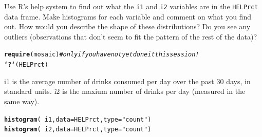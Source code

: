 \documentclass[twoside]{book}\usepackage[]{graphicx}\usepackage[]{xcolor}
\makeatletter
\newcommand{\hlstr}[1]{\textcolor[rgb]{0.192,0.494,0.8}{#1}}%
\newcommand{\hlcom}[1]{\textcolor[rgb]{0.678,0.584,0.686}{\textit{#1}}}%
\newcommand{\hlopt}[1]{\textcolor[rgb]{0,0,0}{#1}}%
\newcommand{\hlstd}[1]{\textcolor[rgb]{0.345,0.345,0.345}{#1}}%
\newcommand{\hlkwc}[1]{\textcolor[rgb]{0.333,0.667,0.333}{#1}}%
\newcommand{\hlkwd}[1]{\textcolor[rgb]{0.737,0.353,0.396}{\textbf{#1}}}%
\newenvironment{kframe}{%
 \def\at@end@of@kframe{}%
 \ifinner\ifhmode%
  \def\at@end@of@kframe{\end{minipage}}%
  \begin{minipage}{\columnwidth}%
 \fi\fi%
 \def\FrameCommand##1{\hskip\@totalleftmargin \hskip-\fboxsep
 \colorbox{shadecolor}{##1}\hskip-\fboxsep
     \hskip-\linewidth \hskip-\@totalleftmargin \hskip\columnwidth}%
 \MakeFramed {\advance\hsize-\width
   \@totalleftmargin\z@ \linewidth\hsize
   \@setminipage}}%
 {\par\unskip\endMakeFramed%
 \at@end@of@kframe}
\newenvironment{knitrout}{}{} %
\newcommand{\variable}[1]{{\color{green!50!black}\texttt{#1}}}
\newcommand{\Rindex}[1]{\index{\texttt{#1}}}
\newcommand{\dataframe}[1]{{\color{blue!80!black}\texttt{#1}}\Rindex{#1}}
\def\R{{\sf R}}
\makeatother
\begin{document}
\begin{problem}
	Use \R's help system to find out what the \variable{i1} and \variable{i2}
	variables are in the \dataframe{HELPrct} data frame.  Make histograms
	for each variable and comment on what you find out.  How would you describe
	the shape of these distributions?  Do you see any outliers (observations
	that don't seem to fit the pattern of the rest of the data)?  
\end{problem}

\begin{solution}
\begin{knitrout}
\color{fgcolor}\begin{kframe}
\begin{alltt}
\hlkwd{require}\hlstd{(mosaic)}  \hlcom{#only if you have not yet done it this session!}
\hlkwd{`?`}\hlstd{(HELPrct)}
\end{alltt}
\end{kframe}
\end{knitrout}
i1 is the average number of drinks consumed per day over the past 30 days, in standard units.  i2 is the maxium number of drinks per day (measured in the same way).  

\begin{knitrout}
\color{fgcolor}\begin{kframe}
\begin{alltt}
\hlkwd{histogram}\hlstd{(}\hlopt{~}\hlstd{i1,} \hlkwc{data} \hlstd{= HELPrct,} \hlkwc{type} \hlstd{=} \hlstr{"count"}\hlstd{)}
\hlkwd{histogram}\hlstd{(}\hlopt{~}\hlstd{i2,} \hlkwc{data} \hlstd{= HELPrct,} \hlkwc{type} \hlstd{=} \hlstr{"count"}\hlstd{)}
\end{alltt}
\end{kframe}


\end{knitrout}
\end{solution}
\end{document}
